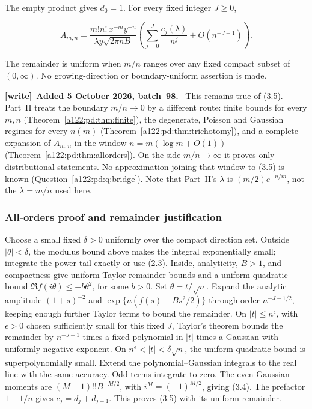 \documentclass[11pt,letterpaper]{article}
\newenvironment{writenote}[1][]{\par\smallskip\begingroup\small
 \noindent\textbf{[write]}\if\relax\detokenize{#1}\relax\else~\textbf{#1.}\fi\ }%
 {\par\endgroup\smallskip}
\numberwithin{equation}{subsection}
\theoremstyle{definition}
\theoremstyle{remark}
\theoremstyle{plain}
\begin{document}
The empty product gives \(d_0=1\). For every fixed integer \(J\ge0\),

\[
 \boxed{\displaystyle
 A_{m,n}=\frac{m!n!\,x^{-m}y^{-n}}{\lambda y\sqrt{2\pi n B}}
 \left(\sum_{j=0}^J\frac{c_j(\lambda)}{n^j}+O(n^{-J-1})\right).}\tag{3.5}
\]

The remainder is uniform when \(m/n\) ranges over any fixed compact subset of \((0,\infty)\). No growing-direction or boundary-uniform assertion is made.

\begin{writenote}[Added 5 October 2026, batch~98]
This remains true of (3.5). Part~II treats the boundary \(m/n\to0\) by a
different route: finite bounds for every \(m,n\)
(Theorem~\ref{a122:pd:thm:finite}), the degenerate, Poisson and Gaussian
regimes for every \(n(m)\) (Theorem~\ref{a122:pd:thm:trichotomy}), and a
complete expansion of \(A_{m,n}\) in the window \(n=m(\log m+O(1))\)
(Theorem~\ref{a122:pd:thm:allorders}). On the side \(m/n\to\infty\) it
proves only distributional statements. No approximation joining that
window to (3.5) is known (Question~\ref{a122:pd:q:bridge}). Note that
Part~II's \(\lambda\) is \((m/2)e^{-n/m}\), not the \(\lambda=m/n\) used
here.
\end{writenote}

\subsubsection{All-orders proof and remainder justification}\label{a122:all-orders-proof-and-remainder-justification}

Choose a small fixed \(\delta>0\) uniformly over the compact direction set. Outside \(|\theta|<\delta\), the modulus bound above makes the integral exponentially small; integrate the power tail exactly or use (2.3). Inside, analyticity, \(B>1\), and compactness give uniform Taylor remainder bounds and a uniform quadratic bound \(\Re f(i\theta)\le-b\theta^2\), for some \(b>0\). Set \(\theta=t/\sqrt n\). Expand the analytic amplitude \((1+s)^{-2}\) and \(\exp\{n(f(s)-Bs^2/2)\}\) through order \(n^{-J-1/2}\), keeping enough further Taylor terms to bound the remainder. On \(|t|\le n^\epsilon\), with \(\epsilon>0\) chosen sufficiently small for this fixed \(J\), Taylor's theorem bounds the remainder by \(n^{-J-1}\) times a fixed polynomial in \(|t|\) times a Gaussian with uniformly negative exponent. On \(n^\epsilon<|t|<\delta\sqrt n\), the uniform quadratic bound is superpolynomially small. Extend the polynomial--Gaussian integrals to the real line with the same accuracy. Odd terms integrate to zero. The even Gaussian moments are \((M-1)!!B^{-M/2}\), with \(i^M=(-1)^{M/2}\), giving (3.4). The prefactor \(1+1/n\) gives \(c_j=d_j+d_{j-1}\). This proves (3.5) with its uniform remainder.
\end{document}
